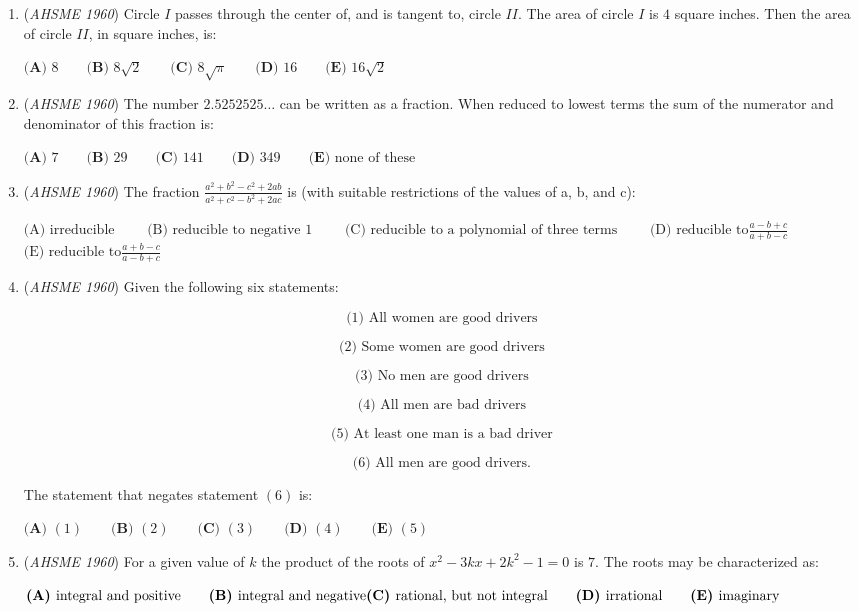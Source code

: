 \begin{enumerate}
	\item (\textit{AHSME 1960}) Circle $I$ passes through the center of, and is tangent to, circle $II$. The area of circle $I$ is $4$ square inches. 
Then the area of circle $II$, in square inches, is:


 $\textbf{(A) }8\qquad \textbf{(B) }8\sqrt{2}\qquad \textbf{(C) }8\sqrt{\pi}\qquad \textbf{(D) }16\qquad \textbf{(E) }16\sqrt{2}$


	\item (\textit{AHSME 1960}) The number $2.5252525\ldots$ can be written as a fraction. 
When reduced to lowest terms the sum of the numerator and denominator of this fraction is:


 $\textbf{(A) }7\qquad \textbf{(B) } 29\qquad \textbf{(C) }141\qquad \textbf{(D) }349\qquad \textbf{(E) }\text{none of these}$


	\item (\textit{AHSME 1960}) The fraction $\frac{a^2+b^2-c^2+2ab}{a^2+c^2-b^2+2ac}$ is (with suitable restrictions of the values of a, b, and c):


 $\text{(A) irreducible}\qquad$
$\text{(B) reducible to negative 1}\qquad$
$\text{(C) reducible to a polynomial of three terms}\qquad$
$\text{(D) reducible to} \frac{a-b+c}{a+b-c}\qquad$
$\text{(E) reducible to} \frac{a+b-c}{a-b+c}$


	\item (\textit{AHSME 1960}) Given the following six statements:

 \[\text{(1) All women are good drivers}\]

 \[\text{(2) Some women are good drivers}\]

 \[\text{(3) No men are good drivers}\]

 \[\text{(4) All men are bad drivers}\]

 \[\text{(5) At least one man is a bad driver}\]

 \[\text{(6) All men are good drivers.}\]


 

The statement that negates statement $(6)$ is:


 

$\textbf{(A) }(1)\qquad \textbf{(B) }(2)\qquad \textbf{(C) }(3)\qquad \textbf{(D) }(4)\qquad \textbf{(E) }(5)$


	\item (\textit{AHSME 1960}) For a given value of $k$ the product of the roots of $x^2-3kx+2k^2-1=0$
is $7$. The roots may be characterized as:


 $\textbf{(A) }\text{integral and positive} \qquad\textbf{(B) }\text{integral and negative} \qquad \\ \textbf{(C) }\text{rational, but not integral} \qquad\textbf{(D) }\text{irrational} \qquad\textbf{(E) } \text{imaginary}$



\end{enumerate}
